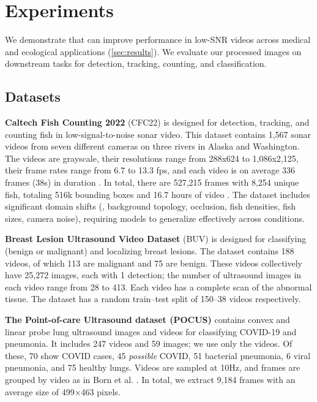 \section{Experiments}\label{sec:experiments}
We demonstrate that \NAME{} can improve performance in low-SNR videos across medical and ecological applications (\cref{sec:results}). We evaluate our processed images on downstream tasks for detection, tracking, counting, and classification. 

\subsection{Datasets} \label{sec:datasets}

\textbf{Caltech Fish Counting 2022}  (CFC22) \cite{cfc2022eccv} is designed for detection, tracking, and counting fish in low-signal-to-noise sonar video. This dataset contains 1,567 sonar videos from seven different cameras on three rivers in Alaska and Washington. The videos are grayscale, their resolutions range from 288x624 to 1,086x2,125, their frame rates range from 6.7 to 13.3 fps, and each video is on average 336 frames (38s) in duration \cite{cfc2022eccv}. In total, there are 527,215 frames with 8,254 unique fish, totaling 516k bounding boxes and 16.7 hours of video \cite{cfc2022eccv}.  The dataset includes significant domain shifts (\eg, background topology, occlusion, fish densities, fish sizes, camera noise), requiring models to generalize effectively across conditions. 

\noindent{}\textbf{Breast Lesion Ultrasound Video Dataset} \cite{CVANet} (BUV) is designed for classifying (benign or malignant) and localizing breast lesions. The dataset contains 188 videos, of which 113 are malignant and 75 are benign. These videos collectively have 25,272 images, each with 1 detection; the number of ultrasound images in each video range from 28 to 413. Each video has a complete scan of the abnormal tissue. The dataset has a random train--test split of 150--38 videos respectively\cite{CVANet}.

\noindent{}\textbf{The Point-of-care Ultrasound dataset (POCUS)} \cite{born2021accelerating, born2021l2} contains convex and linear probe lung ultrasound images and videos for classifying COVID-19 and pneumonia. It includes 247 videos and 59 images; we use only the videos. Of these, 70 show COVID cases, 45 \textit{possible} COVID, 51 bacterial pneumonia, 6 viral pneumonia, and 75 healthy lungs. Videos are sampled at 10Hz, and frames are grouped by video as in Born et al. \cite{born2021accelerating, born2021l2}. In total, we extract 9,184 frames with an average size of 499×463 pixels.

